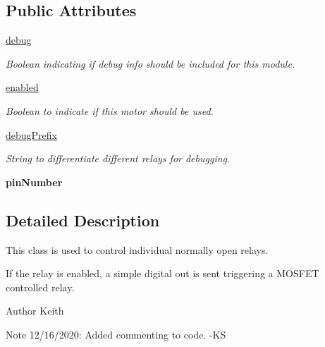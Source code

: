 \subsection*{Public Attributes}
\begin{DoxyCompactItemize}
\item 
\mbox{\label{classmcs_1_1firmware_1_1RelayControl_1_1RelayControl_ab11103706eb6f9296650ed241f2acba6}} 
\hyperlink{classmcs_1_1firmware_1_1RelayControl_1_1RelayControl_ab11103706eb6f9296650ed241f2acba6}{debug}
\begin{DoxyCompactList}\small\item\em Boolean indicating if debug info should be included for this module. \end{DoxyCompactList}\item 
\hyperlink{classmcs_1_1firmware_1_1RelayControl_1_1RelayControl_a9ae2c738456b71efdc1bb687daa69f83}{enabled}
\begin{DoxyCompactList}\small\item\em Boolean to indicate if this motor should be used. \end{DoxyCompactList}\item 
\mbox{\label{classmcs_1_1firmware_1_1RelayControl_1_1RelayControl_a58fe9f8bf4076973fed73b42b34d5cae}} 
\hyperlink{classmcs_1_1firmware_1_1RelayControl_1_1RelayControl_a58fe9f8bf4076973fed73b42b34d5cae}{debug\+Prefix}
\begin{DoxyCompactList}\small\item\em String to differentiate different relays for debugging. \end{DoxyCompactList}\item 
\mbox{\label{classmcs_1_1firmware_1_1RelayControl_1_1RelayControl_a44ad6ffce67e2095fc4c74d2af66be8f}} 
{\bfseries pin\+Number}
\end{DoxyCompactItemize}


\subsection{Detailed Description}
This class is used to control individual normally open relays. 

If the relay is enabled, a simple digital out is sent triggering a M\+O\+S\+F\+ET controlled relay. \begin{DoxyAuthor}{Author}
Keith 
\end{DoxyAuthor}
\begin{DoxyNote}{Note}
12/16/2020\+: Added commenting to code. -\/\+KS 
\end{DoxyNote}


